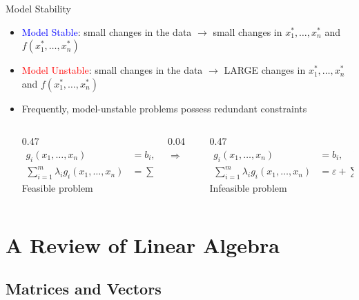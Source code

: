 \documentclass[aspectratio=169,hyperref,UTF8,CJK]{beamer}
\begin{document}
\begin{frame}{Model Stability}
  \footnotesize
  \begin{itemize}
    \item \textcolor{blue}{Model Stable}: small changes in the data $\rightarrow$ small changes in $x_1^*,\ldots,x_n^*$ and $f(x_1^*,\ldots,x_n^*)$
    \item \textcolor{red}{Model Unstable}: small changes in the data $\rightarrow$ LARGE changes in $x_1^*,\ldots,x_n^*$ and $f(x_1^*,\ldots,x_n^*)$
    \item Frequently, model-unstable problems possess redundant constraints
      \begin{columns}[T,onlytextwidth]
        \begin{column}{0.47\textwidth}
          \begin{align*}
            g_i(x_1,\ldots,x_n)&=b_i,\quad\forall i,\\
            \sum_{i=1}^{m}\lambda_i g_i(x_1,\ldots,x_n)&=\sum_{i=1}^{m}\lambda_i b_i
          \end{align*}
          \centering Feasible problem
        \end{column}
        \begin{column}{0.04\textwidth}
          \centering\vspace{8mm}$\Rightarrow$
        \end{column}
        \begin{column}{0.47\textwidth}
          \begin{align*}
            g_i(x_1,\ldots,x_n)&=b_i,\quad\forall i,\\
            \sum_{i=1}^{m}\lambda_i g_i(x_1,\ldots,x_n)&=\varepsilon+\sum_{i=1}^{m}\lambda_i b_i
          \end{align*}
          \centering Infeasible problem
        \end{column}
      \end{columns}
  \end{itemize}
\end{frame}

\section{A Review of Linear Algebra}
\subsection{Matrices and Vectors}
\end{document}
